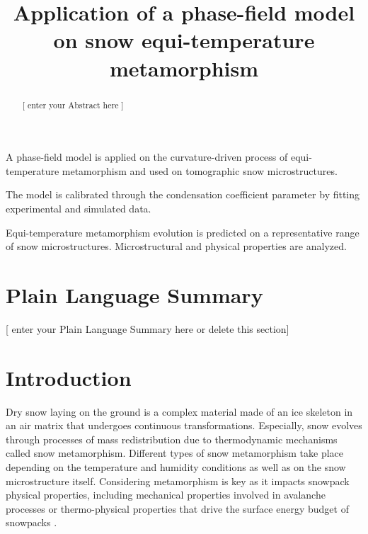 \documentclass[draft,ms]{agujournal2019}
\begin{document}
\title{Application of a phase-field model on snow equi-temperature metamorphism}







\begin{keypoints}
\item A phase-field model is applied on the curvature-driven process of equi-temperature metamorphism and used on tomographic snow microstructures.
\item The model is calibrated through the condensation coefficient parameter by fitting experimental and simulated data.
\item Equi-temperature metamorphism evolution is predicted on a representative range of snow microstructures. Microstructural and physical properties are analyzed.
\end{keypoints}


\begin{abstract}
[ enter your Abstract here ]
\end{abstract}

\section*{Plain Language Summary}
[ enter your Plain Language Summary here or delete this section]



\section{Introduction}
\label{sec:intro}
Dry snow laying on the ground is a complex material made of an ice skeleton in an air matrix that undergoes continuous transformations. Especially, snow evolves through processes of mass redistribution due to thermodynamic mechanisms called snow metamorphism. Different types of snow metamorphism take place depending on the temperature and humidity conditions as well as on the snow microstructure itself. Considering metamorphism is key as it impacts snowpack physical properties, including mechanical properties involved in avalanche processes or thermo-physical properties that drive the surface energy budget of snowpacks \cite{vionnet_detailed_2012, lehning_physical_2002}.\\
\end{document}
